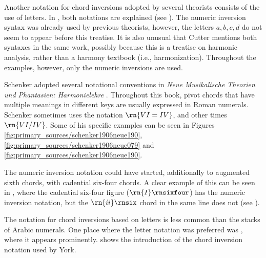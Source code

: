 

Another notation for chord inversions adopted by several
theorists consists of the use of letters. In
\textcite{cutter1902harmonic}, both notations are explained
(see ). The
numeric inversion syntax was already used by previous
theorists, however, the letters ${a, b, c , d}$ do not seem
to appear before this treatise. It is also unusual that
Cutter mentions both syntaxes in the same work, possibly
because this is a treatise on harmonic analysis, rather than
a harmony textbook (i.e., harmonization). Throughout the
examples, however, only the numeric inversions are used.

Schenker adopted several notational conventions in
\emph{Neue Musikalische Theorien und Phantasien:
Harmonielehre} \parencite{schenker1906neue}. Throughout this
book, pivot chords that have multiple meanings in different
keys are usually expressed in Roman numerals. Schenker
sometimes uses the notation $\rn{VI=IV}$, and other times
$\rn{VI/IV}$. Some of his specific examples can be seen in
Figures \ref{fig:primary_sources/schenker1906neue190},
\ref{fig:primary_sources/schenker1906neue079} and
\ref{fig:primary_sources/schenker1906neue190}.




The numeric inversion notation could have started,
additionally to augmented sixth chords, with cadential
six-four chords. A clear example of this can be seen in
\textcite{loewengard1908lehrbuch}, where the cadential
six-four figure ($\rn{I}\rnsixfour$) has the numeric
inversion notation, but the $\rn{ii}\rnsix$ chord in the
same line does not (see
).


The notation for chord inversions based on letters is less
common than the stacks of Arabic numerals. One place where
the letter notation was preferred was
\textcite{york1909practical}, where it appears prominently.
 shows the
introduction of the chord inversion notation used by York.

